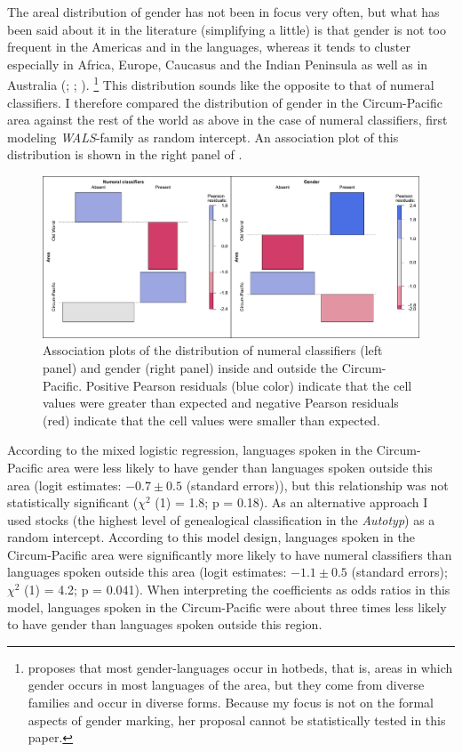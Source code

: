 \documentclass[output=collectionpaper]{langsci/langscibook}
\begin{document}
The areal distribution of gender has not been in focus very often, but what has been said about it in the literature (simplifying a little) is that gender is not too frequent in the Americas and in the  languages, whereas it tends to cluster especially in Africa, Europe, Caucasus and the Indian Peninsula as well as in Australia (\citealt[1--2]{Corbett1991}; \citealt[130--132]{Nichols1992}; \citealt{Corbett2013}).%
\footnote{\citet[130--132]{Nichols1992} proposes that most gender-languages occur in hotbeds, that is, areas in which gender occurs in most languages of the area, but they come from diverse families and occur in diverse forms. Because my focus is not on the formal aspects of gender marking, her proposal cannot be statistically tested in this paper.} %
This distribution sounds like the opposite to that of numeral classifiers. I therefore compared the distribution of gender in the Circum-Pacific area against the rest of the world as above in the case of numeral classifiers, first modeling \textit{WALS}{}-family as random intercept. An association plot of this distribution is shown in the right panel of .

\begin{figure}
\includegraphics[width=\textwidth]{figures/13/Fig5_assocplot}
\caption{Association plots of the distribution of numeral classifiers (left panel) and gender (right panel) inside and outside the Circum-Pacific. Positive Pearson residuals (blue color) indicate that the cell values were greater than expected and negative Pearson residuals (red) indicate that the cell values were smaller than expected.}
\label{fig:Sinne:5}
\end{figure}

According to the mixed logistic regression, languages spoken in the Circum-Pacific area were less likely to have gender than languages spoken outside this area (logit estimates: $-0.7 \pm 0.5$ (standard errors)), but this relationship was not statistically significant ($\chi^2$ (1) = 1.8; p = 0.18). As an alternative approach I used stocks (the highest level of genealogical classification in the \textit{Autotyp}) as a random intercept. According to this model design, languages spoken in the Circum-Pacific area were significantly more likely to have numeral classifiers than languages spoken outside this area (logit estimates: $-1.1 \pm 0.5$ (standard errors); $\chi^2$ (1) = 4.2; p = 0.041). When interpreting the coefficients as odds ratios in this model, languages spoken in the Circum-Pacific were about three times less likely to have gender than languages spoken outside this region.
\end{document}
